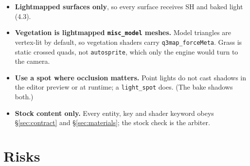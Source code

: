 \documentclass[11pt,a4paper]{article}
\begin{document}
\begin{itemize}
  which is the worst case for normal maps and the best case for them to matter. Judge materials
  under the carried light, not under the sun.
\item \textbf{Lightmapped surfaces only}, so every surface receives SH and baked light (4.3).
\item \textbf{Vegetation is lightmapped \texttt{misc\_model} meshes.} Model triangles are vertex-lit
  by default, so vegetation shaders carry \texttt{q3map\_forceMeta}. Grass is static crossed quads, not
  \texttt{autosprite}, which only the engine would turn to the camera.
\item \textbf{Use a spot where occlusion matters.} Point lights do not cast shadows in the editor
  preview or at runtime; a \texttt{light\_spot} does. (The bake shadows both.)
\item \textbf{Stock content only.} Every entity, key and shader keyword obeys
  §\ref{sec:contract} and §\ref{sec:materials}; the stock check is the arbiter.
\end{itemize}

\section{Risks}
\end{document}
